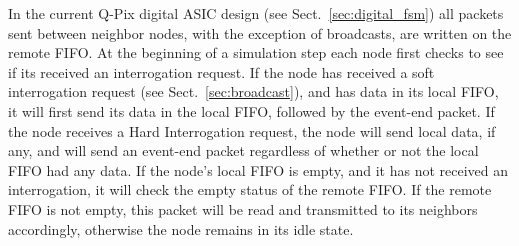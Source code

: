 In the current Q-Pix digital ASIC design (see Sect.~\ref{sec:digital_fsm}) all packets sent between neighbor nodes, with the exception of broadcasts, are written on the remote FIFO.
At the beginning of a simulation step each node first checks to see if its received an interrogation request.
If the node has received a soft interrogation request (see Sect.~\ref{sec:broadcast}), and has data in its local FIFO, it will first send its data in the local FIFO, followed by the event-end packet.
If the node receives a Hard Interrogation request, the node will send local data, if any, and will send an event-end packet regardless of whether or not the local FIFO had any data.
If the node's local FIFO is empty, and it has not received an interrogation, it will check the empty status of the remote FIFO.
If the remote FIFO is not empty, this packet will be read and transmitted to its neighbors accordingly, otherwise the node remains in its idle state.

